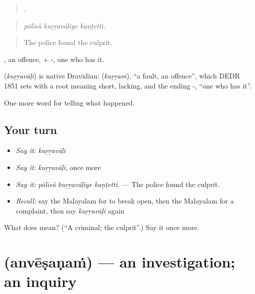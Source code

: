 \begin{quote}
  .
\end{quote}

\begin{quote}
\emph{pōlīsŭ kuṟṟavāḷiye kaṇṭetti.}
\end{quote}

\begin{quote}
The police found the culprit.
\end{quote}

, an offence, + -, one who has it.

\begin{cousinweb}
\textbf{} (\emph{kuṟṟavāḷi}) is native Dravidian:  (\emph{kuṟṟaṁ}), \textquotedblleft{}a fault, an offence\textquotedblright{}, which DEDR 1851 sets with a root meaning short, lacking, and the ending -, \textquotedblleft{}one who has it\textquotedblright{}.
\end{cousinweb}

\begin{grammarlens}[title={What you've built}]
One more word for telling what happened.
\end{grammarlens}

\subsection*{Your turn}
\begin{itemize}
\raggedright
  \item \emph{Say it:} \emph{kuṟṟavāḷi}
  \item \emph{Say it:} \emph{kuṟṟavāḷi}, once more
  \item \emph{Say it:} \emph{pōlīsŭ kuṟṟavāḷiye kaṇṭetti.} — The police found the culprit.
  \item \emph{Recall:} say the Malayalam for to break open, then the Malayalam for a complaint, then say \emph{kuṟṟavāḷi} again
\end{itemize}

\begin{tcolorbox}[breakable,colback=teal!4,colframe=teal!35!black,title={Before you move on}]
What does  mean? (\textquotedblleft{}A criminal; the culprit\textquotedblright{}.) Say it once more.
\end{tcolorbox}
\section[\texorpdfstring{\ml{അന്വേഷണം} (anvēṣaṇaṁ)}{അന്വേഷണം (anvēṣaṇaṁ)}]{ (anvēṣaṇaṁ) — an investigation; an inquiry}

